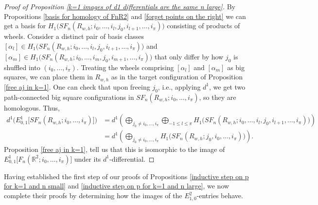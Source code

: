 \documentclass[pagebackref,colorlinks,citecolor=blue,linkcolor=blue,urlcolor=blue,filecolor=blue]{article}
\theoremstyle{definition}\newtheorem{definition}[thm]{Definition}
\theoremstyle{definition}
\newcommand{\R}{\ensuremath{\mathbb{R}}}
\begin{document}
\begin{proof}[Proof of Proposition \ref{k=1 images of d1 differentials are the same n large}]
By Propositions \ref{basis for homology of FnR2} and \ref{forget points on the right} we can get a basis for $H_{1}\big(SF_{n}(R_{w, h}; i_{0}, \dots, i_{l}, j_{0}, i_{l+1},\dots, i_{\pi})\big)$ consisting of products of wheels.
Consider a distinct pair of basis classes $[\alpha_{l}]\in H_{1}\big(SF_{n}(R_{w, h}; i_{0}, \dots, i_{l}, j_{0}, i_{l+1},\dots, i_{\pi})\big)$ and $[\alpha_{m}]\in H_{1}\big(SF_{n}(R_{w, h}; i_{0}, \dots, i_{m}, j_{0}, i_{m+1},\dots, i_{\pi})\big)$ that only differ by how $j_{0}$ is shuffled into $(i_{0}, \dots, i_{\pi})$.
Treating the wheels comprising $[\alpha_{l}]$ and $[\alpha_{m}]$ as big squares, we can place them in $R_{w,h}$ as in the target configuration of Proposition \ref{free aj in k=1}.
One can check that upon freeing $j_{0}$, i.e., applying $d^{1}$, we get two path-connected big square configurations in $SF_{n}(R_{w, h}; i_{0},\dots, i_{\pi})$, so they are homologous.
Thus,
\begin{align*}
d^{1}\Big(E^{1}_{0,1}\big[SF_{n}(R_{w, h}; i_{0}, \dots, i_{\pi})\big]\Big)&=d^{1}\left(\bigoplus_{j_{0}\neq i_{0}, \dots, i_{\pi}}\bigoplus_{-1\le l\le \pi}H_{1}\big(SF_{n}(R_{w, h}; i_{0}, \dots, i_{l}, j_{0}, i_{l+1},\dots, i_{\pi})\big)\right)\\
&=d^{1}\left(\bigoplus_{j_{0}\neq i_{0}, \dots, i_{\pi}}H_{1}\big(SF_{n}(R_{w, h};j_{0},i_{0},\dots, i_{\pi})\big)\right).
\end{align*}
Proposition \ref{free aj in k=1}, tell us that this is isomorphic to the image of $E^{1}_{0,1}\big[F_{n}(\R^{2}; i_{0}, \dots, i_{\pi})\big]$ under its $d^{1}$-differential.
\end{proof}

Having established the first step of our proofs of Propositions \ref{inductive step on p for k=1 and n small} and \ref{inductive step on p for k=1 and n large}, we now complete their proofs by determining how the images of the $E^{2}_{1,0}$-entries behave.
\end{document}
